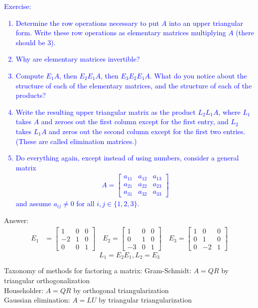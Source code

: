 \documentclass{ximera}
\begin{document}
\textcolor{blue}{Exercise: 
\begin{enumerate}
    \item Determine the row operations necessary to put $A$ into an upper triangular form.  Write these row operations as elementary matrices multiplying $A$ (there should be 3).   
    \item Why are elementary matrices invertible?
    \item Compute $E_1A$, then $E_2E_1A$, then $E_3E_2E_1A$.  What do you notice about the structure of each of the elementary matrices, and the structure of each of the products?
    \item Write the resulting upper triangular matrix as the product $L_2L_1A$, where $L_1$ takes $A$ and zeroes out the first column except for the first entry, and $L_2$ takes $L_1A$ and zeros out the second column except for the first two entries.  (These are called elimination matrices.)
    \item Do everything again, except instead of using numbers, consider a general matrix 
    \begin{align*}
        A = \begin{bmatrix} a_{11} & a_{12} & a_{13} \\
        a_{21} & a_{22} & a_{23} \\
        a_{31} & a_{32} & a_{33}\end{bmatrix}
    \end{align*}
    and assume $a_{ij} \neq 0$ for all $i,j \in \{1,2,3\}$.
\end{enumerate}
}
Answer: \begin{align*}
E_1 &= \begin{bmatrix}
1 & 0 & 0\\
-2 & 1 & 0\\
0 & 0 & 1
\end{bmatrix}\quad
E_2 = \begin{bmatrix}
1 & 0 & 0\\
0 & 1 & 0\\
-3 & 0 & 1
\end{bmatrix}\quad
E_3 = \begin{bmatrix}
1 & 0 & 0\\
0 & 1 & 0\\
0 & -2 & 1
\end{bmatrix}
\end{align*}
\[L_1 = E_2E_1, L_2 = E_3\]


Taxonomy of methods for factoring a matrix: 
Gram-Schmidt: $A = QR$ by triangular orthogonalization
\\
Householder: $A = QR$ by orthogonal triangularization
\\
Gaussian elimination: $A = LU$ by triangular triangularization
\end{document}
